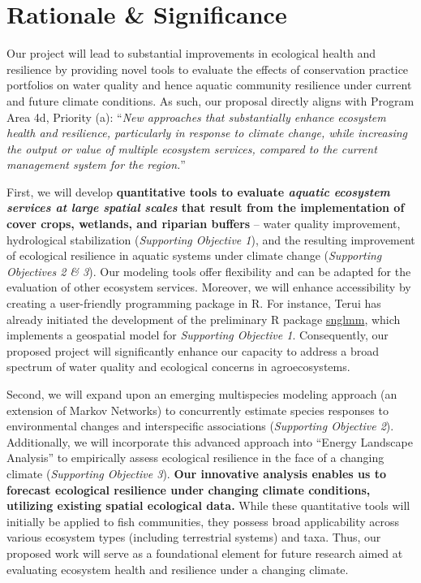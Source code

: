 \documentclass[12pt, class=article, crop=false]{standalone}
\begin{document}
\section{Rationale \& Significance}

Our project will lead to substantial improvements in ecological health and resilience by providing novel tools to evaluate the effects of conservation practice portfolios on water quality and hence aquatic community resilience under current and future climate conditions.
As such, our proposal directly aligns with Program Area 4d, Priority (a): ``\textit{New approaches that substantially enhance ecosystem health and resilience, particularly in response to climate change, while increasing the output or value of multiple ecosystem services, compared to the current management system for the region.}''

First, we will develop \textbf{quantitative tools to evaluate \textit{aquatic ecosystem services at large spatial scales} that result from the implementation of cover crops, wetlands, and riparian buffers} -- water quality improvement, hydrological stabilization (\textit{Supporting Objective 1}), and the resulting improvement of ecological resilience in aquatic systems under climate change (\textit{Supporting Objectives 2 \& 3}).
Our modeling tools offer flexibility and can be adapted for the evaluation of other ecosystem services.
Moreover, we will enhance accessibility by creating a user-friendly programming package in R.
For instance, Terui has already initiated the development of the preliminary R package \url{snglmm}, which implements a geospatial model for \textit{Supporting Objective 1}.
Consequently, our proposed project will significantly enhance our capacity to address a broad spectrum of water quality and ecological concerns in agroecosystems.

Second, we will expand upon an emerging multispecies modeling approach (an extension of Markov Networks) to concurrently estimate species responses to environmental changes and interspecific associations (\textit{Supporting Objective 2}).
Additionally, we will incorporate this advanced approach into ``Energy Landscape Analysis'' to empirically assess ecological resilience in the face of a changing climate (\textit{Supporting Objective 3}).
\textbf{Our innovative analysis enables us to forecast ecological resilience under changing climate conditions, utilizing existing spatial ecological data.}
While these quantitative tools will initially be applied to fish communities, they possess broad applicability across various ecosystem types (including terrestrial systems) and taxa.
Thus, our proposed work will serve as a foundational element for future research aimed at evaluating ecosystem health and resilience under a changing climate.
\end{document}
